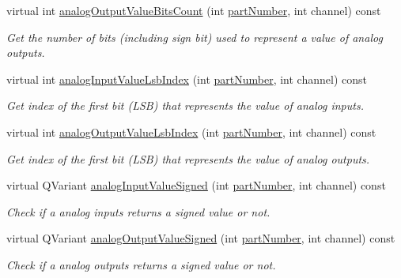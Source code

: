 \begin{DoxyCompactItemize}
virtual int \hyperlink{classmdt_device_modbus_wago_module_a4c24b14835ab4f57caf342513bc88a02}{analog\-Output\-Value\-Bits\-Count} (int \hyperlink{classmdt_device_modbus_wago_module_ab694800ebccf308beb9eeb9a789b0442}{part\-Number}, int channel) const 
\begin{DoxyCompactList}\small\item\em Get the number of bits (including sign bit) used to represent a value of analog outputs. \end{DoxyCompactList}\item 
virtual int \hyperlink{classmdt_device_modbus_wago_module_ab17c99ea4bdaa05fa1c2006d23c936e5}{analog\-Input\-Value\-Lsb\-Index} (int \hyperlink{classmdt_device_modbus_wago_module_ab694800ebccf308beb9eeb9a789b0442}{part\-Number}, int channel) const 
\begin{DoxyCompactList}\small\item\em Get index of the first bit (L\-S\-B) that represents the value of analog inputs. \end{DoxyCompactList}\item 
virtual int \hyperlink{classmdt_device_modbus_wago_module_a36876268b29010f7dc096c5e092e7240}{analog\-Output\-Value\-Lsb\-Index} (int \hyperlink{classmdt_device_modbus_wago_module_ab694800ebccf308beb9eeb9a789b0442}{part\-Number}, int channel) const 
\begin{DoxyCompactList}\small\item\em Get index of the first bit (L\-S\-B) that represents the value of analog outputs. \end{DoxyCompactList}\item 
virtual Q\-Variant \hyperlink{classmdt_device_modbus_wago_module_aead7f379126d8fb570a179dff857040f}{analog\-Input\-Value\-Signed} (int \hyperlink{classmdt_device_modbus_wago_module_ab694800ebccf308beb9eeb9a789b0442}{part\-Number}, int channel) const 
\begin{DoxyCompactList}\small\item\em Check if a analog inputs returns a signed value or not. \end{DoxyCompactList}\item 
virtual Q\-Variant \hyperlink{classmdt_device_modbus_wago_module_a9a0e0e145ea269221042c6b5af26850c}{analog\-Output\-Value\-Signed} (int \hyperlink{classmdt_device_modbus_wago_module_ab694800ebccf308beb9eeb9a789b0442}{part\-Number}, int channel) const 
\begin{DoxyCompactList}\small\item\em Check if a analog outputs returns a signed value or not. \end{DoxyCompactList}\item 

\end{DoxyCompactItemize}
